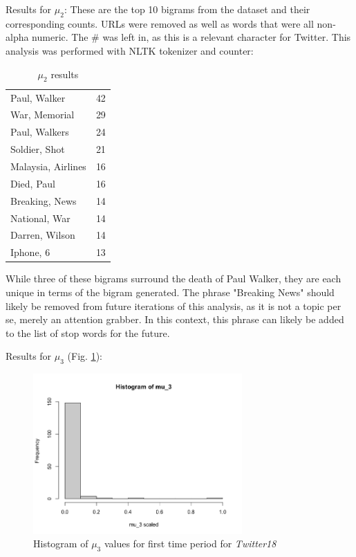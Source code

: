\documentclass[preprint,review,12pt]{elsarticle}
\begin{document}
Results for $\mu_2$:
These are the top 10 bigrams from the dataset and their corresponding counts. URLs were removed as well as words that were all non-alpha numeric. The \# was left in, as this is a relevant character for Twitter. This analysis was performed with NLTK tokenizer and counter:

\begin{table}[h]
    \centering
    \begin{tabular}{|p{4cm}|p{2cm}|}
    \hline
         Paul, Walker & 42 \\
         War, Memorial & 29 \\
         Paul, Walkers & 24 \\
         Soldier, Shot & 21 \\
         Malaysia, Airlines & 16 \\
         Died, Paul & 16 \\
         Breaking, News & 14 \\
         National, War & 14 \\
         Darren, Wilson & 14 \\
         Iphone, 6 & 13 \\
    \hline
    \end{tabular}
    \caption{$\mu_2$ results}
    \label{tab:mu_2 results}
\end{table}

While three of these bigrams surround the death of Paul Walker, they are each unique in terms of the bigram generated. The phrase "Breaking News" should likely be removed from future iterations of this analysis, as it is not a topic per se, merely an attention grabber. In this context, this phrase can likely be added to the list of stop words for the future.

Results for $\mu_3$ (Fig. \ref{fig:Hist mu_3 Twitter18}):
\begin{figure}[h!]
    \centering
    \includegraphics[width=8cm]{histogram_mu_3_scaled.png}
    \caption{Histogram of $\mu_3$ values for first time period for \textit{Twitter18}}
    \label{fig:Hist mu_3 Twitter18}
\end{figure}
\end{document}
